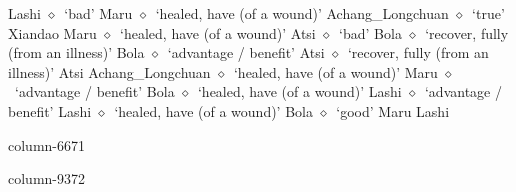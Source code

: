 \hspace{1ex}
         Lashi 
\hspace{1ex}
         $\diamond$~`bad'
         Maru 
\hspace{1ex}
         $\diamond$~`healed, have (of a wound)'
         Achang\_Longchuan 
\hspace{1ex}
         $\diamond$~`true'
         Xiandao 
\hspace{1ex}
         Maru 
\hspace{1ex}
         $\diamond$~`healed, have (of a wound)'
         Atsi 
\hspace{1ex}
         $\diamond$~`bad'
         Bola 
\hspace{1ex}
         $\diamond$~`recover, fully (from an illness)'
         Bola 
\hspace{1ex}
         $\diamond$~`advantage / benefit'
         Atsi 
\hspace{1ex}
         $\diamond$~`recover, fully (from an illness)'
         Atsi 
\hspace{1ex}
         Achang\_Longchuan 
\hspace{1ex}
         $\diamond$~`healed, have (of a wound)'
         Maru 
\hspace{1ex}
         $\diamond$~`advantage / benefit'
         Bola 
\hspace{1ex}
         $\diamond$~`healed, have (of a wound)'
         Lashi 
\hspace{1ex}
         $\diamond$~`advantage / benefit'
         Lashi 
\hspace{1ex}
         $\diamond$~`healed, have (of a wound)'
         Bola 
\hspace{1ex}
         $\diamond$~`good'
         Maru 
\hspace{1ex}
         Lashi 
  \item {\footnotesize \textbf{}}{\tiny column-6671}
  \item {\footnotesize \textbf{}}{\tiny column-9372}
